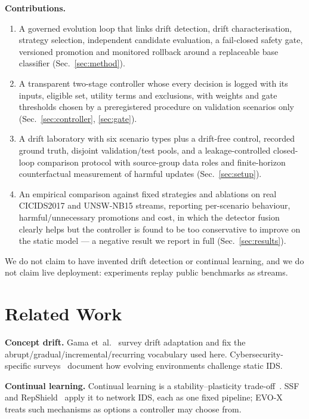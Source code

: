 \documentclass[conference]{IEEEtran}
\newcommand{\evox}{\textsc{EVO-X}}
\begin{document}
\textbf{Contributions.}
\begin{enumerate}
  \item A governed evolution loop that links drift detection, drift characterisation, strategy selection, independent candidate evaluation, a fail-closed safety gate, versioned promotion and monitored rollback around a replaceable base classifier (Sec.~\ref{sec:method}).
  \item A transparent two-stage controller whose every decision is logged with its inputs, eligible set, utility terms and exclusions, with weights and gate thresholds chosen by a preregistered procedure on validation scenarios only (Sec.~\ref{sec:controller}, \ref{sec:gate}).
  \item A drift laboratory with six scenario types plus a drift-free control, recorded ground truth, disjoint validation/test pools, and a leakage-controlled closed-loop comparison protocol with source-group data roles and finite-horizon counterfactual measurement of harmful updates (Sec.~\ref{sec:setup}).
  \item An empirical comparison against fixed strategies and ablations on real CICIDS2017 and UNSW-NB15 streams, reporting per-scenario behaviour, harmful/unnecessary promotions and cost, in which the detector fusion clearly helps but the controller is found to be too conservative to improve on the static model --- a negative result we report in full (Sec.~\ref{sec:results}).
\end{enumerate}
We do not claim to have invented drift detection or continual learning, and we do not claim live deployment: experiments replay public benchmarks as streams.

\section{Related Work}
\textbf{Concept drift.} Gama et~al.~\cite{gama2014survey} survey drift adaptation and fix the abrupt/gradual/incremental/recurring vocabulary used here. Cybersecurity-specific surveys~\cite{evolving2024survey} document how evolving environments challenge static IDS.

\textbf{Continual learning.} Continual learning is a stability--plasticity trade-off~\cite{wang2024cl}. SSF~\cite{zhang2024ssf} and RepShield~\cite{liu2026repshield} apply it to network IDS, each as one fixed pipeline; \evox{} treats such mechanisms as options a controller may choose from.
\end{document}
